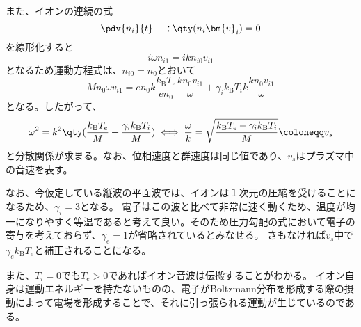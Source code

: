 また、イオンの連続の式
\begin{equation}
	\pdv{n_i}{t} + \div{\qty(n_i\bm{v}_i)} = 0
\end{equation}
を線形化すると
\begin{equation}
	i\omega{}n_{i1} = ikn_{i0}v_{i1}
\end{equation}
となるため運動方程式は、$n_{i0} = n_0$とおいて
\begin{equation}
	Mn_0\omega{}v_{i1} = en_0k\frac{k_{\text{B}}T_e}{en_0}\frac{kn_0v_{i1}}{\omega} + \gamma_ik_{\text{B}}T_ik\frac{kn_0v_{i1}}{\omega}
\end{equation}
となる。したがって、
\begin{equation}
	\omega^2 = k^2\qty(\frac{k_{\text{B}}T_e}{M} + \frac{\gamma_ik_{\text{B}}T_i}{M}) \iff \frac{\omega}{k} = \sqrt{\frac{k_{\text{B}}T_e + \gamma_ik_{\text{B}}T_i}{M}} \coloneqq v_s
\end{equation}
と分散関係が求まる。なお、位相速度と群速度は同じ値であり、$v_s$はプラズマ中の音速を表す。

なお、今仮定している縦波の平面波では、イオンは１次元の圧縮を受けることになるため、$\gamma_i = 3$となる。
電子はこの波と比べて非常に速く動くため、温度が均一になりやすく等温であると考えて良い。そのため圧力勾配の式において電子の寄与を考えておらず、$\gamma_e=1$が省略されているとみなせる。
さもなければ$v_s$中で$\gamma_ek_{\text{B}}T_e$と補正されることになる。

また、$T_i = 0$でも$T_e > 0$であればイオン音波は伝搬することがわかる。
イオン自身は運動エネルギーを持たないものの、電子がBoltzmann分布を形成する際の摂動によって電場を形成することで、それに引っ張られる運動が生じているのである。

